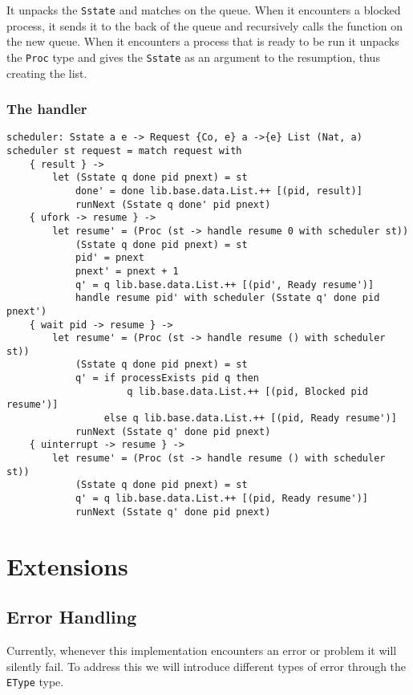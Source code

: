 \documentclass[logo,bsc,singlespacing,parskip]{infthesis}
\begin{document}
It unpacks the \texttt{Sstate} and matches on the queue. When it encounters a
blocked process, it sends it to the back of the queue and recursively calls the
function on the new queue. When it encounters a process that is ready to be run
it unpacks the \texttt{Proc} type and gives the \texttt{Sstate} as an argument
to the resumption, thus creating the list.

\subsection{The handler}

\begin{lstlisting}[language=unison]
scheduler: Sstate a e -> Request {Co, e} a ->{e} List (Nat, a)
scheduler st request = match request with 
    { result } -> 
        let (Sstate q done pid pnext) = st 
            done' = done lib.base.data.List.++ [(pid, result)]
            runNext (Sstate q done' pid pnext)
    { ufork -> resume } -> 
        let resume' = (Proc (st -> handle resume 0 with scheduler st))
            (Sstate q done pid pnext) = st
            pid' = pnext
            pnext' = pnext + 1
            q' = q lib.base.data.List.++ [(pid', Ready resume')]
            handle resume pid' with scheduler (Sstate q' done pid pnext')
    { wait pid -> resume } -> 
        let resume' = (Proc (st -> handle resume () with scheduler st))
            (Sstate q done pid pnext) = st
            q' = if processExists pid q then
                     q lib.base.data.List.++ [(pid, Blocked pid resume')]
                 else q lib.base.data.List.++ [(pid, Ready resume')]
            runNext (Sstate q' done pid pnext)
    { uinterrupt -> resume } -> 
        let resume' = (Proc (st -> handle resume () with scheduler st))
            (Sstate q done pid pnext) = st
            q' = q lib.base.data.List.++ [(pid, Ready resume')]
            runNext (Sstate q' done pid pnext)
\end{lstlisting}

\chapter{Extensions}

\section{Error Handling}

Currently, whenever this implementation encounters an error or problem it will
silently fail. To address this we will introduce different types of error
through the \texttt{EType} type.
\end{document}
